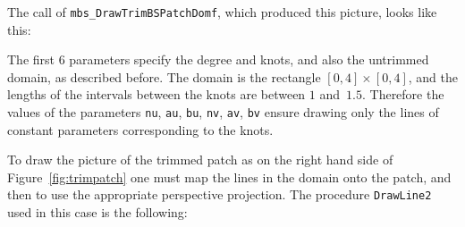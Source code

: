 The call of \texttt{mbs\_DrawTrimBSPatchDomf}, which produced this picture,
looks like this:

\vspace{\medskipamount}
\vspace{\medskipamount}

The first $6$ parameters specify the degree and knots, and also the untrimmed
domain, as described before.
The domain is the rectangle $[0,4]\times[0,4]$, and the lengths of
the intervals between the knots are between $1$ and~$1.5$.
Therefore the values of the parameters \texttt{nu}, \texttt{au}, \texttt{bu},
\texttt{nv}, \texttt{av}, \texttt{bv} ensure drawing only the lines of constant
parameters corresponding to the knots.

To draw the picture of the trimmed patch as on the right hand side
of Figure~\ref{fig:trimpatch} one must map the lines in the domain
onto the patch, and then to use the appropriate perspective projection.
The procedure \texttt{DrawLine2} used in this case is the following:

